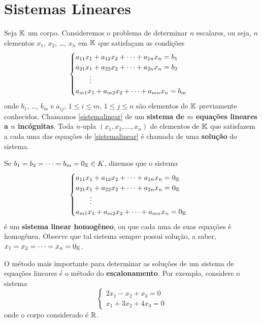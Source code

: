 \section{Sistemas Lineares}\label{ssub:sistemas_lineares}
Seja $\mathbb{K}$ um corpo. Consideremos o problema de determinar $n$ escalares, ou seja, $n$ elementos $x_1$, $x_2$, \dots, $x_n$ em $\mathbb{K}$ que satisfa\c{c}am as condi\c{c}\~oes
\begin{equation}\label{sistemalinear}\index{Sistema Linear}
	\begin{cases}
		a_{11}x_1 + a_{12}x_2 + \cdots + a_{1n}x_n = b_1\\
		a_{21}x_1 + a_{22}x_2 + \cdots + a_{2n}x_n = b_2\\
		\qquad \vdots\\
		a_{m1}x_1 + a_{m2}x_2 + \cdots + a_{mn}x_n = b_m\\
	\end{cases}
\end{equation}
onde $b_1$, \dots, $b_m$ e $a_{ij}$, $1 \le i \le m$, $1 \le j \le n$ s\~ao elementos de $\mathbb{K}$ previamente conhecidos. Chamamos \eqref{sistemalinear} de um \textbf{sistema de $m$ equa\c{c}\~oes lineares a $n$ inc\'ognitas}. Toda $n$-upla $(x_1, x_2, \dots, x_n)$ de elementos de $\mathbb{K}$ que satisfazem a cada uma das equa\c{c}\~oes de \eqref{sistemalinear} \'e chamada de uma \textbf{solu\c{c}\~ao} do sistema. 

Se $b_1 = b_2 = \cdots = b_m = 0_{\mathbb{K}} \in K$, dizemos que o sistema
\begin{equation}\label{sistemalinearhomogeneo}\index{Sistema Linear}
	\begin{cases}
		a_{11}x_1 + a_{12}x_2 + \cdots + a_{1n}x_n = 0_\cp{K}\\
		a_{21}x_1 + a_{22}x_2 + \cdots + a_{2n}x_n = 0_\cp{K}\\
		\qquad \vdots\\
		a_{m1}x_1 + a_{m2}x_2 + \cdots + a_{mn}x_n = 0_\cp{K}\\
	\end{cases}
\end{equation}
\'e um \textbf{sistema linear homog\^eneo}, ou que cada uma de suas equa\c{c}\~oes \'e homog\^enea. Observe que tal sistema sempre possui solu\c{c}\~ao, a saber, $x_1 = x_2 = \cdots = x_n = 0_{\mathbb{K}}$.

O m\'etodo mais importante para determinar as solu\c{c}\~oes de um sistema de equa\c{c}\~oes lineares \'e o m\'etodo do \textbf{escalonamento}. Por exemplo, considere o sistema
\begin{equation}\label{exemploplo1}
\begin{cases}
	2x_1 - x_2 + x_3 = 0\\
	x_1 + 3x_2 + 4x_ 3 = 0
\end{cases}
\end{equation}
onde o corpo considerado \'e $\mathbb{R}$.

